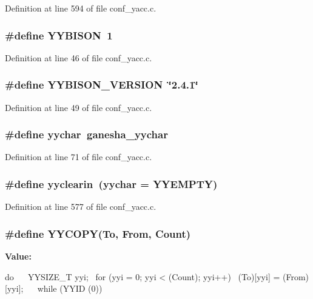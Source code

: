 Definition at line 594 of file conf\_\-yacc.c.
\subsubsection[{YYBISON}]{\setlength{\rightskip}{0pt plus 5cm}\#define YYBISON~1}\label{conf__yacc_8c_a9f092f5b1dca6a6249fb2c7c8065b031}


Definition at line 46 of file conf\_\-yacc.c.
\subsubsection[{YYBISON\_\-VERSION}]{\setlength{\rightskip}{0pt plus 5cm}\#define YYBISON\_\-VERSION~\char`\"{}2.4.1\char`\"{}}\label{conf__yacc_8c_a72ebd0ca5807efcc6a5ae4fb72dd1553}


Definition at line 49 of file conf\_\-yacc.c.
\subsubsection[{yychar}]{\setlength{\rightskip}{0pt plus 5cm}\#define {\bf yychar}~ganesha\_\-yychar}\label{conf__yacc_8c_a34af3aa88645c2f95bbb4d573f8713cb}


Definition at line 71 of file conf\_\-yacc.c.
\subsubsection[{yyclearin}]{\setlength{\rightskip}{0pt plus 5cm}\#define yyclearin~({\bf yychar} = YYEMPTY)}\label{conf__yacc_8c_a5035d59933b3f5388c44f596145db047}


Definition at line 577 of file conf\_\-yacc.c.
\subsubsection[{YYCOPY}]{\setlength{\rightskip}{0pt plus 5cm}\#define YYCOPY(To, \/  From, \/  Count)}\label{conf__yacc_8c_ad6586b145b5cddce4eec46f35d59b1dd}
{\bfseries Value:}
\begin{DoxyCode}
do                                      \
        {                                       \
          YYSIZE_T yyi;                         \
          for (yyi = 0; yyi < (Count); yyi++)   \
            (To)[yyi] = (From)[yyi];            \
        }                                       \
      while (YYID (0))
\end{DoxyCode}



